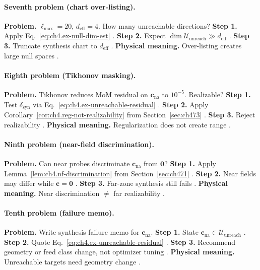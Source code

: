 \paragraph{Seventh problem (chart over-listing).}
\textbf{Problem.} \(\ell_{\max}=20\), \(d_{\mathrm{eff}}=4\). How many unreachable directions?
\textbf{Step 1.} Apply Eq.~\eqref{eq:ch4.ex-null-dim-est} \cite{hansen1988,harrington2001}.
\textbf{Step 2.} Expect \(\dim\mathcal{U}_{\mathrm{unreach}}\gg d_{\mathrm{eff}}\) \cite{stratton1941,devaney2004}.
\textbf{Step 3.} Truncate synthesis chart to \(d_{\mathrm{eff}}\) \cite{jackson1999,hansen1988}.
\textbf{Physical meaning.} Over-listing creates large null spaces \cite{harrington2001,stratton1941}.

\paragraph{Eighth problem (Tikhonov masking).}
\textbf{Problem.} Tikhonov reduces MoM residual on \(\mathbf{c}_{\mathrm{na}}\) to \(10^{-5}\). Realizable?
\textbf{Step 1.} Test \(\delta_{\mathrm{syn}}\) via Eq.~\eqref{eq:ch4.ex-unreachable-residual} \cite{harrington2001,stratton1941}.
\textbf{Step 2.} Apply Corollary~\ref{cor:ch4.reg-not-realizability} from Section~\ref{sec:ch473} \cite{devaney2004,hansen1988}.
\textbf{Step 3.} Reject realizability \cite{jackson1999,harrington2001}.
\textbf{Physical meaning.} Regularization does not create range \cite{stratton1941,devaney2004}.

\paragraph{Ninth problem (near-field discrimination).}
\textbf{Problem.} Can near probes discriminate \(\mathbf{c}_{\mathrm{na}}\) from \(\mathbf{0}\)?
\textbf{Step 1.} Apply Lemma~\ref{lem:ch4.nf-discrimination} from Section~\ref{sec:ch471} \cite{harrington2001,stratton1941}.
\textbf{Step 2.} Near fields may differ while \(\mathbf{c}=\mathbf{0}\) \cite{devaney2004,hansen1988}.
\textbf{Step 3.} Far-zone synthesis still fails \cite{jackson1999,harrington2001}.
\textbf{Physical meaning.} Near discrimination \(\neq\) far realizability \cite{stratton1941,devaney2004}.

\paragraph{Tenth problem (failure memo).}
\textbf{Problem.} Write synthesis failure memo for \(\mathbf{c}_{\mathrm{na}}\).
\textbf{Step 1.} State \(\mathbf{c}_{\mathrm{na}}\in\mathcal{U}_{\mathrm{unreach}}\) \cite{harrington2001,stratton1941}.
\textbf{Step 2.} Quote Eq.~\eqref{eq:ch4.ex-unreachable-residual} \cite{devaney2004,hansen1988}.
\textbf{Step 3.} Recommend geometry or feed class change, not optimizer tuning \cite{jackson1999,harrington2001}.
\textbf{Physical meaning.} Unreachable targets need geometry change \cite{stratton1941,devaney2004}.

